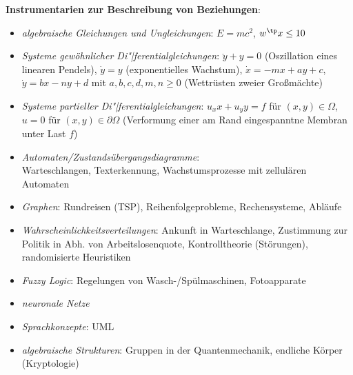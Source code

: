 \textbf{Instrumentarien zur Beschreibung von Beziehungen}:
\begin{itemize}
    \item
    \emph{algebraische Gleichungen und Ungleichungen}:
    $E = mc^2$, $w^\tp x \le 10$

    \item
    \emph{Systeme gewöhnlicher Di"|ferentialgleichungen}:
    $\ddot{y} + y = 0$ (Oszillation eines linearen Pendels),
    $\dot{y} = y$ (exponentielles Wachstum),
    $\dot{x} = -mx + ay + c$, $\dot{y} = bx - ny + d$ mit $a, b, c, d, m, n \ge 0$
    (Wettrüsten zweier Großmächte)

    \item
    \emph{Systeme partieller Di"|ferentialgleichungen}:
    $u_xx + u_yy = f$ für $(x, y) \in \Omega$, $u = 0$ für $(x, y) \in \partial \Omega$
    (Verformung einer am Rand eingespanntne Membran unter Last $f$)

    \item
    \emph{Automaten/Zustandsübergangsdiagramme}:\\
    Warteschlangen,
    Texterkennung,
    Wachstumsprozesse mit zellulären Automaten

    \item
    \emph{Graphen}:
    Rundreisen (TSP),
    Reihenfolgeprobleme,
    Rechensysteme,
    Abläufe

    \item
    \emph{Wahrscheinlichkeitsverteilungen}:
    Ankunft in Warteschlange,
    Zustimmung zur Politik in Abh. von Arbeitslosenquote,
    Kontrolltheorie (Störungen),
    randomisierte Heuristiken

    \item
    \emph{Fuzzy Logic}:
    Regelungen von Wasch-/Spülmaschinen,
    Fotoapparate

    \item
    \emph{neuronale Netze}

    \item
    \emph{Sprachkonzepte}:
    UML

    \item
    \emph{algebraische Strukturen}:
    Gruppen in der Quantenmechanik,
    endliche Körper (Kryptologie)
\end{itemize}

\linie


